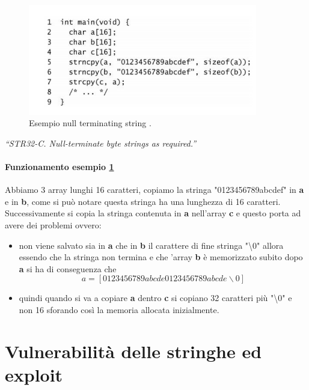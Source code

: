 \begin{figure}[H]
    \centering
    \includegraphics[width=10cm, keepaspectratio]{capitoli/secure_coding/img/cap_2/null_string.png}
    \caption{Esempio null terminating string .}\label{fig:null_string}
\end{figure}
\textit{“STR32-C. Null-terminate byte strings as
    required.”}

\paragraph{Funzionamento esempio \ref{fig:null_string}}
Abbiamo 3 array lunghi 16 caratteri, copiamo la stringa "0123456789abcdef" in \textbf{a} e in \textbf{b}, come si può notare questa stringa ha una lunghezza di 16 caratteri. Successivamente si copia la stringa contenuta in \textbf{a} nell'array \textbf{c} e questo porta ad avere dei problemi ovvero:
\begin{itemize}
    \item non viene salvato sia in \textbf{a} che in \textbf{b} il carattere di fine stringa "\textbackslash0" allora essendo che la stringa non termina e che 'array \textbf{b} è memorizzato subito dopo \textbf{a} si ha di conseguenza che
          \[a = [0123456789abcde0123456789abcde\backslash 0]\]
    \item quindi quando si va a copiare \textbf{a} dentro \textbf{c} si copiano 32 caratteri più "\textbackslash0" e non 16 sforando così la memoria allocata inizialmente.
\end{itemize}
\section{Vulnerabilità delle stringhe ed exploit}
